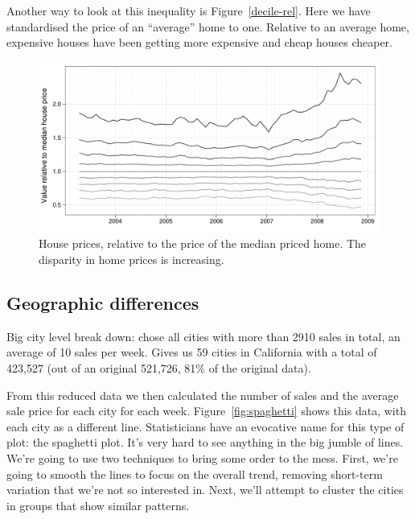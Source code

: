\documentclass[oneside]{article}
\begin{document}
Another way to look at this inequality is Figure~\ref{decile-rel}.  Here we have standardised the price of an ``average'' home to one.  Relative to an average home, expensive houses have been getting more expensive and cheap houses cheaper.

\begin{figure}[htbp]
  \centering
  \includegraphics[width=0.75\linewidth]{decile-rel}
  \caption{House prices, relative to the price of the median priced home.  The disparity in home prices is increasing.}
  \label{fig:decile-rel}
\end{figure}

\subsection{Geographic differences}


Big city level break down: chose all cities with more than 2910 sales in total, an average of 10 sales per week.  Gives us 59 cities in California with a total of 423,527 (out of an original 521,726, 81\% of the original data).  

% 

From this reduced data we then calculated the number of sales and the average sale price for each city for each week.  Figure~\ref{fig:spaghetti} shows this data, with each city as a different line.  Statisticians have an evocative name for this type of plot: the spaghetti plot.  It's very hard to see anything in the big jumble of lines.  We're going to use two techniques to bring some order to the mess.  First, we're going to smooth the lines to focus on the overall trend, removing short-term variation that we're not so interested in.  Next, we'll attempt to cluster the cities in groups that show similar patterns.
\end{document}
